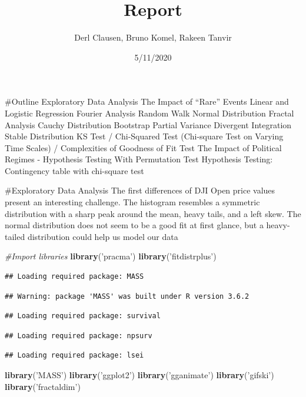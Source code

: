 \documentclass[]{article}
\title{Report}
\author{Derl Clausen, Bruno Komel, Rakeen Tanvir}
\date{5/11/2020}
\newenvironment{Shaded}{\begin{snugshade}}{\end{snugshade}}
\newcommand{\CommentTok}[1]{\textcolor[rgb]{0.56,0.35,0.01}{\textit{#1}}}
\newcommand{\KeywordTok}[1]{\textcolor[rgb]{0.13,0.29,0.53}{\textbf{#1}}}
\newcommand{\NormalTok}[1]{#1}
\newcommand{\StringTok}[1]{\textcolor[rgb]{0.31,0.60,0.02}{#1}}
\begin{document}
\maketitle

\#Outline Exploratory Data Analysis The Impact of ``Rare'' Events Linear
and Logistic Regression Fourier Analysis Random Walk Normal Distribution
Fractal Analysis Cauchy Distribution Bootstrap Partial Variance
Divergent Integration Stable Distribution KS Test / Chi-Squared Test
(Chi-square Test on Varying Time Scales) / Complexities of Goodness of
Fit Test The Impact of Political Regimes - Hypothesis Testing With
Permutation Test Hypothesis Testing: Contingency table with chi-square
test

\#Exploratory Data Analysis The first differences of DJI Open price
values present an interesting challenge. The histogram resembles a
symmetric distribution with a sharp peak around the mean, heavy tails,
and a left skew. The normal distribution does not seem to be a good fit
at first glance, but a heavy-tailed distribution could help us model our
data

\begin{Shaded}
\begin{Highlighting}[]
\CommentTok{#Import libraries}
\KeywordTok{library}\NormalTok{(}\StringTok{'pracma'}\NormalTok{)}
\KeywordTok{library}\NormalTok{(}\StringTok{'fitdistrplus'}\NormalTok{)}
\end{Highlighting}
\end{Shaded}

\begin{verbatim}
## Loading required package: MASS
\end{verbatim}

\begin{verbatim}
## Warning: package 'MASS' was built under R version 3.6.2
\end{verbatim}

\begin{verbatim}
## Loading required package: survival
\end{verbatim}

\begin{verbatim}
## Loading required package: npsurv
\end{verbatim}

\begin{verbatim}
## Loading required package: lsei
\end{verbatim}

\begin{Shaded}
\begin{Highlighting}[]
\KeywordTok{library}\NormalTok{(}\StringTok{'MASS'}\NormalTok{)}
\KeywordTok{library}\NormalTok{(}\StringTok{'ggplot2'}\NormalTok{)}
\KeywordTok{library}\NormalTok{(}\StringTok{'gganimate'}\NormalTok{)}
\KeywordTok{library}\NormalTok{(}\StringTok{'gifski'}\NormalTok{)}
\KeywordTok{library}\NormalTok{(}\StringTok{'fractaldim'}\NormalTok{)}
\end{Highlighting}
\end{Shaded}
\end{document}
